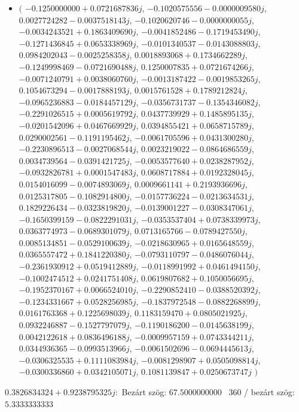 \documentclass[14pt,a4paper]{article}
\begin{document}
\begin{itemize}
\item
$\big($
$-0.1250000000+0.0721687836j$, $-0.1020575556-0.0000009580j$, $0.0027724282-0.0037518143j$, $-0.1020620746-0.0000000055j$, $-0.0034243521+0.1863409690j$, $-0.0041852486-0.1719453490j$, $-0.1271436845+0.0653338969j$, $-0.0101340537-0.0143088803j$, $0.0984202043-0.0025258358j$, $0.0018893068+0.1734662289j$, $-0.1249998469-0.0721690488j$, $0.1250007835+0.0721674266j$, $-0.0071240791+0.0038060760j$, $-0.0013187422-0.0019853265j$, $0.1054673294-0.0017888193j$, $0.0015761528+0.1789212824j$, $-0.0965236883-0.0184457129j$, $-0.0356731737-0.1354346082j$, $-0.2291026515+0.0005619792j$, $0.0437739929+0.1485895135j$, $-0.0201542096+0.0467669929j$, $0.0394855421+0.0658715789j$, $0.0290002561-0.1191195462j$, $-0.0061705596+0.0431300280j$, $-0.2230896513-0.0027068544j$, $0.0023219022-0.0864686559j$, $0.0034739564-0.0391421725j$, $-0.0053577640+0.0238287952j$, $-0.0932826781+0.0001547483j$, $0.0608717884+0.0192328045j$, $0.0154016099-0.0074893069j$, $0.0009661141+0.2193936696j$, $0.0125317805-0.1082914800j$, $-0.0157736224-0.0213634531j$, $0.1829226434-0.0323819820j$, $-0.0139001227-0.0308347061j$, $-0.1650399159-0.0822291031j$, $-0.0353537404+0.0738339973j$, $0.0363774973-0.0689301079j$, $0.0713165766-0.0789427550j$, $0.0085134851-0.0529100639j$, $-0.0218630965+0.0165648559j$, $0.0365557472+0.1841220380j$, $-0.0793110797-0.0486076044j$, $-0.2361930912+0.0519412889j$, $-0.0118991992+0.0461494150j$, $-0.1002474512+0.0241751408j$, $0.0619807682+0.1050056695j$, $-0.1952370167+0.0066524010j$, $-0.2290852410-0.0388520392j$, $-0.1234331667+0.0528256985j$, $-0.1837972548-0.0882268899j$, $0.0161763368+0.1225698039j$, $0.1183159470+0.0805021925j$, $0.0932246887-0.1527797079j$, $-0.1190186200-0.0145638199j$, $0.0042122618+0.0836496188j$, $-0.0009957159+0.0743344211j$, $0.0344936365-0.0993513966j$, $-0.0061502696-0.0694445613j$, $-0.0306325535+0.1111083984j$, $-0.0081298907+0.0505098814j$, $-0.0300336860+0.0342105071j$, $0.1081139847+0.0250673747j$
$\big)$
\end{itemize}
$0.3826834324+0.9238795325j$:\
Bezárt szög: $67.5000000000$ \
360 / bezárt szög: $5.3333333333$\
\end{document}
